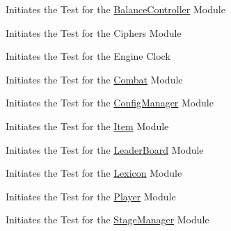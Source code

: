 \begin{DoxyRefList}
Initiates the Test for the \mbox{\hyperlink{classBalanceController}{Balance\+Controller}} Module  
\item[Member \mbox{\hyperlink{classTestSuite_a8b0ff44237c7896691193ee60c3baaf7}{Test\+Suite\+::Case\+Ciphers}} ()]\label{todo__todo000250}%
%
Initiates the Test for the Ciphers Module  
\item[Member \mbox{\hyperlink{classTestSuite_a1c17aa08795a9a78c2c3788885a70dd3}{Test\+Suite\+::Case\+Clock}} ()]\label{todo__todo000249}%
%
Initiates the Test for the Engine Clock  
\item[Member \mbox{\hyperlink{classTestSuite_a15f3e94cbd9ed2e2986f7f50459c52fb}{Test\+Suite\+::Case\+Combat}} ()]\label{todo__todo000251}%
%
Initiates the Test for the \mbox{\hyperlink{classCombat}{Combat}} Module  
\item[Member \mbox{\hyperlink{classTestSuite_a37bdf09c053c377f71c3186544194341}{Test\+Suite\+::Case\+Config}} ()]\label{todo__todo000252}%
%
Initiates the Test for the \mbox{\hyperlink{classConfigManager}{Config\+Manager}} Module  
\item[Member \mbox{\hyperlink{classTestSuite_ad8a02cb1ad7648568c6dccc5aec6fc16}{Test\+Suite\+::Case\+Item}} ()]\label{todo__todo000253}%
%
Initiates the Test for the \mbox{\hyperlink{classItem}{Item}} Module  
\item[Member \mbox{\hyperlink{classTestSuite_a65593908ff09ba67c56c259d2ec7f85b}{Test\+Suite\+::Case\+Leader}} ()]\label{todo__todo000254}%
%
Initiates the Test for the \mbox{\hyperlink{classLeaderBoard}{Leader\+Board}} Module  
\item[Member \mbox{\hyperlink{classTestSuite_a48e5c7ef181e433c7ca29aaaca9e1a38}{Test\+Suite\+::Case\+Lexicon}} ()]\label{todo__todo000255}%
%
Initiates the Test for the \mbox{\hyperlink{classLexicon}{Lexicon}} Module  
\item[Member \mbox{\hyperlink{classTestSuite_a2ffe2efd91d0e2b12b03d7dfbc9f7080}{Test\+Suite\+::Case\+Player}} ()]\label{todo__todo000256}%
%
Initiates the Test for the \mbox{\hyperlink{classPlayer}{Player}} Module  
\item[Member \mbox{\hyperlink{classTestSuite_ad87532734d5a0ae0c887ccb90961855a}{Test\+Suite\+::Case\+Stage}} ()]\label{todo__todo000257}%
%
Initiates the Test for the \mbox{\hyperlink{classStageManager}{Stage\+Manager}} Module  

\end{DoxyRefList}
